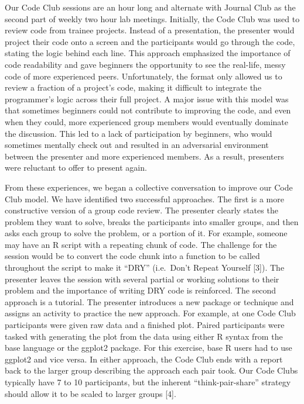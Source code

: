 \documentclass[
  11pt,
]{article}
\begin{document}
Our Code Club sessions are an hour long and alternate with Journal Club
as the second part of weekly two hour lab meetings. Initially, the Code
Club was used to review code from trainee projects. Instead of a
presentation, the presenter would project their code onto a screen and
the participants would go through the code, stating the logic behind
each line. This approach emphasized the importance of code readability
and gave beginners the opportunity to see the real-life, messy code of
more experienced peers. Unfortunately, the format only allowed us to
review a fraction of a project's code, making it difficult to integrate
the programmer's logic across their full project. A major issue with
this model was that sometimes beginners could not contribute to
improving the code, and even when they could, more experienced group
members would eventually dominate the discussion. This led to a lack of
participation by beginners, who would sometimes mentally check out and
resulted in an adversarial environment between the presenter and more
experienced members. As a result, presenters were reluctant to offer to
present again.

From these experiences, we began a collective conversation to improve
our Code Club model. We have identified two successful approaches. The
first is a more constructive version of a group code review. The
presenter clearly states the problem they want to solve, breaks the
participants into smaller groups, and then asks each group to solve the
problem, or a portion of it. For example, someone may have an R script
with a repeating chunk of code. The challenge for the session would be
to convert the code chunk into a function to be called throughout the
script to make it ``DRY'' (i.e.~Don't Repeat Yourself {[}3{]}). The
presenter leaves the session with several partial or working solutions
to their problem and the importance of writing DRY code is reinforced.
The second approach is a tutorial. The presenter introduces a new
package or technique and assigns an activity to practice the new
approach. For example, at one Code Club participants were given raw data
and a finished plot. Paired participants were tasked with generating the
plot from the data using either R syntax from the base language or the
ggplot2 package. For this exercise, base R users had to use ggplot2 and
vice versa. In either approach, the Code Club ends with a report back to
the larger group describing the approach each pair took. Our Code Clubs
typically have 7 to 10 participants, but the inherent
``think-pair-share'' strategy should allow it to be scaled to larger
groups {[}4{]}.
\end{document}
